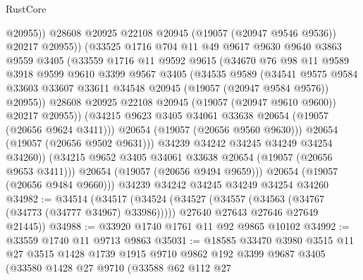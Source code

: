 \begin{lexlean}{RustCore}
\begin{coremodule}
                      @20955))
                  @28608
                  @20925
                  @22108
                  @20945
                  (@19057 (@20947 @9546 @9536))
                  @20217
                  @20955))
              (@33525
                @1716
                @704
                @11
                @49
                @9617
                @9630
                @9640
                @3863
                @9559
                @3405
                (@33559
                  @1716
                  @11
                  @9592
                  @9615
                  (@34670
                    @76
                    @98
                    @11
                    @9589
                    @3918
                    @9599
                    @9610
                    @3399
                    @9567
                    @3405
                    (@34535
                      @9589
                      (@34541
                        @9575
                        @9584
                        @33603
                        @33607
                        @33611
                        @34548
                        @20945
                        (@19057 (@20947 @9584 @9576))
                        @20955))
                    @28608
                    @20925
                    @22108
                    @20945
                    (@19057 (@20947 @9610 @9600))
                    @20217
                    @20955))
                (@34215 @9623 @3405 @34061 @33638 @20654 (@19057 (@20656 @9624 @3411)))
                @20654
                (@19057 (@20656 @9560 @9630)))
              @20654
              (@19057 (@20656 @9502 @9631)))
            @34239
            @34242
            @34245
            @34249
            @34254
            @34260))
        (@34215 @9652 @3405 @34061 @33638 @20654 (@19057 (@20656 @9653 @3411)))
        @20654
        (@19057 (@20656 @9494 @9659)))
      @20654
      (@19057 (@20656 @9484 @9660)))
    @34239
    @34242
    @34245
    @34249
    @34254
    @34260
@34982 := @34514
    (@34517
      (@34524
        (@34527 (@34557 (@34563 (@34767 (@34773 (@34777 @34967) @33986)))))
        @27640
        @27643
        @27646
        @27649
        @21445))
@34988 := @33920 @1740 @1761 @11 @92 @9865 @10102
@34992 := @33559 @1740 @11 @9713 @9863
@35031 := @18585
    @33470
    @3980
    @3515
    @11
    @27
    @3515
    @1428
    @1739
    @1915
    @9710
    @9862
    @192
    @3399
    @9687
    @3405
    (@33580
      @1428
      @27
      @9710
      (@33588
        @62
        @112
        @27

\end{coremodule}
\end{lexlean}
